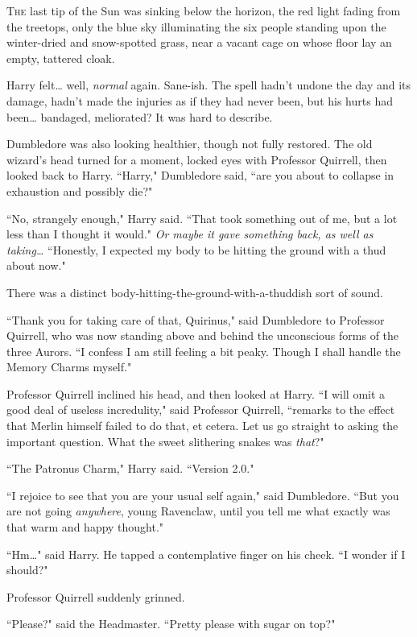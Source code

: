 
\lettrine{T}{he} last tip of the Sun was sinking below the horizon, the red light fading from the treetops, only the blue sky illuminating the six people standing upon the winter-dried and snow-spotted grass, near a vacant cage on whose floor lay an empty, tattered cloak.

Harry felt{\ldots} well, \emph{normal} again. Sane-ish. The spell hadn't undone the day and its damage, hadn't made the injuries as if they had never been, but his hurts had been{\ldots} bandaged, meliorated? It was hard to describe.

Dumbledore was also looking healthier, though not fully restored. The old wizard's head turned for a moment, locked eyes with Professor Quirrell, then looked back to Harry. ``Harry," Dumbledore said, ``are you about to collapse in exhaustion and possibly die?"

``No, strangely enough," Harry said. ``That took something out of me, but a lot less than I thought it would." \emph{Or maybe it gave something back, as well as taking{\ldots}} ``Honestly, I expected my body to be hitting the ground with a thud about now."

There was a distinct body-hitting-the-ground-with-a-thuddish sort of sound.

``Thank you for taking care of that, Quirinus," said Dumbledore to Professor Quirrell, who was now standing above and behind the unconscious forms of the three Aurors. ``I confess I am still feeling a bit peaky. Though I shall handle the Memory Charms myself."

Professor Quirrell inclined his head, and then looked at Harry. ``I will omit a good deal of useless incredulity," said Professor Quirrell, ``remarks to the effect that Merlin himself failed to do that, et cetera. Let us go straight to asking the important question. What the sweet slithering snakes was \emph{that}?"

``The Patronus Charm," Harry said. ``Version 2.0."

``I rejoice to see that you are your usual self again," said Dumbledore. ``But you are not going \emph{anywhere}, young Ravenclaw, until you tell me what exactly was that warm and happy thought."

``Hm{\ldots}" said Harry. He tapped a contemplative finger on his cheek. ``I wonder if I should?"

Professor Quirrell suddenly grinned.

``Please?" said the Headmaster. ``Pretty please with sugar on top?"

